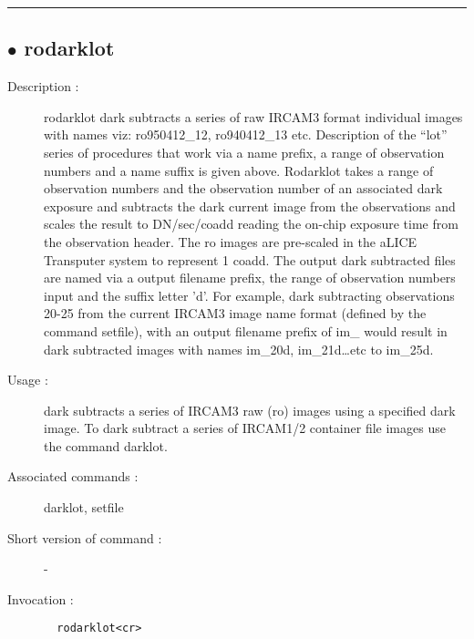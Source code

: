 \hrule \subsection*{$\bullet$ rodarklot}
\begin{description}
\item[Description :] rodarklot dark subtracts a series of raw {\sc IRCAM3} format
individual images with names viz: ro950412\_12, ro940412\_13 etc.
Description of the ``lot'' series of procedures that work via a name
prefix, a range of observation numbers and a name suffix is given above.
Rodarklot takes a range of observation numbers and the observation number
of an associated dark exposure and subtracts the dark current image from
the observations and scales the result to DN/sec/coadd reading the
on-chip exposure time from the observation header.  The ro images are
pre-scaled in the aLICE Transputer system to represent 1 coadd.  The
output dark subtracted files are named via a output filename prefix, the
range of observation numbers input and the suffix letter 'd'.  For
example, dark subtracting observations 20-25 from the current {\sc IRCAM3}
image name format (defined by the command setfile), with an output
filename prefix of im\_ would result in dark subtracted images with names
im\_20d, im\_21d\ldots  etc to im\_25d.
\item[Usage :] dark subtracts a series of {\sc IRCAM3} raw (ro) images using a
specified dark image.  To dark subtract a series of {\sc IRCAM1/2} container
file images use the command darklot.
\item[Associated commands :] darklot, setfile
\item[Short version of command :] -
\item[Invocation :]

\verb+  rodarklot<cr> +\end{description}


